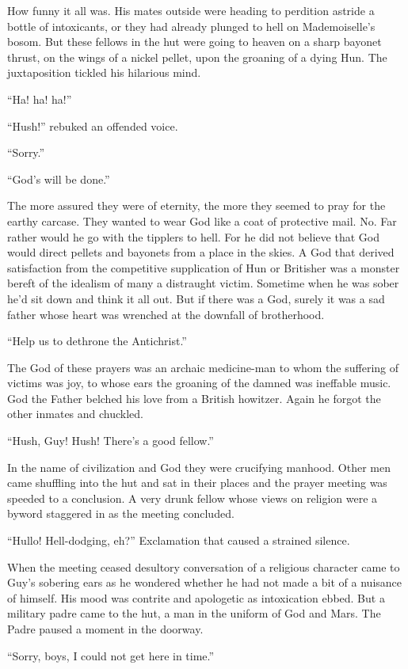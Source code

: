How funny it all was. His mates outside were heading to perdition astride a bottle of intoxicants, or they had already plunged to hell on Mademoiselle's bosom. But these fellows in the hut were going to heaven on a sharp bayonet thrust, on the wings of a nickel pellet, upon the groaning of a dying Hun. The juxtaposition tickled his hilarious mind.

``Ha! ha! ha!''

``Hush!'' rebuked an offended voice.

``Sorry.''

``God's will be done.''

The more assured they were of eternity, the more they seemed to pray for the earthy carcase. They wanted to wear God like a coat of protective mail. No. Far rather would he go with the tipplers to hell. For he did not believe that God would direct pellets and bayonets from a place in the skies. A God that derived satisfaction from the competitive supplication of Hun or Britisher was a monster bereft of the idealism of many a distraught victim. Sometime when he was sober he'd sit down and think it all out. But if there was a God, surely it was a sad father whose heart was wrenched at the downfall of brotherhood.

``Help us to dethrone the Antichrist.''

The God of these prayers was an archaic medicine-man to whom the suffering of victims was joy, to whose ears the groaning of the damned was ineffable music. God the Father belched his love from a British howitzer. Again he forgot the other inmates and chuckled.

``Hush, Guy! Hush! There's a good fellow.''

In the name of civilization and God they were crucifying manhood. Other men came shuffling into the hut and sat in their places and the prayer meeting was speeded to a conclusion. A very drunk fellow whose views on religion were a byword staggered in as the meeting concluded.

``Hullo! Hell-dodging, eh?'' Exclamation that caused a strained silence.

When the meeting ceased desultory conversation of a religious character came to Guy's sobering ears as he wondered whether he had not made a bit of a nuisance of himself. His mood was contrite and apologetic as intoxication ebbed. But a military padre came to the hut, a man in the uniform of God and Mars. The Padre paused a moment in the doorway.

``Sorry, boys, I could not get here in time.''

